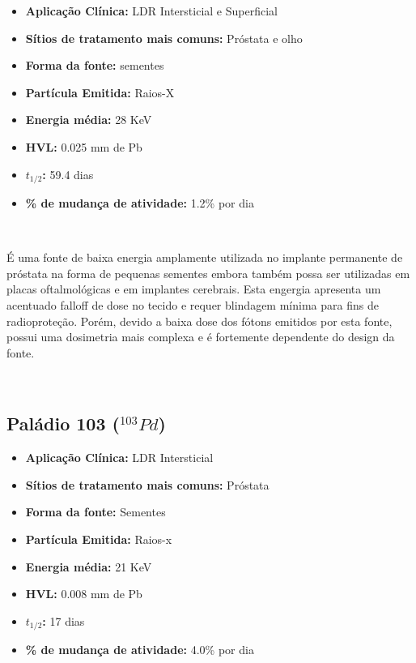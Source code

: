 \documentclass[11pt,a4paper]{article}
\begin{document}
			\begin{itemize}
				\item \textbf{Aplicação Clínica:} LDR Intersticial e Superficial
				\item \textbf{Sítios de tratamento mais comuns:} Próstata e olho
				\item \textbf{Forma da fonte:} sementes
				\item \textbf{Partícula Emitida:} Raios-X
				\item \textbf{Energia média: } 28 KeV
				\item \textbf{HVL:} 0.025 mm de Pb
				\item \textbf{$t_{1/2}$:} 59.4 dias
				\item \textbf{\% de mudança de atividade: } 1.2\% por dia
			\end{itemize}

			\

			É uma fonte de baixa energia amplamente utilizada no implante permanente de próstata na forma de pequenas sementes embora também possa ser utilizadas em placas oftalmológicas e em implantes cerebrais. Esta engergia apresenta um acentuado falloff de dose no tecido e requer blindagem mínima para fins de radioproteção. Porém, devido a baixa dose dos fótons emitidos por esta fonte, possui uma dosimetria mais complexa e é fortemente dependente do design da fonte.

			\

		\subsection{Paládio 103 \textbf{\textcolor{CarnationPink}{(${}^{103}Pd$)}}}


			\begin{itemize}
				\item \textbf{Aplicação Clínica:} LDR Intersticial
				\item \textbf{Sítios de tratamento mais comuns:} Próstata
				\item \textbf{Forma da fonte:} Sementes
				\item \textbf{Partícula Emitida:} Raios-x
				\item \textbf{Energia média: } 21 KeV
				\item \textbf{HVL:} 0.008 mm de Pb
				\item \textbf{$t_{1/2}$:} 17 dias
				\item \textbf{\% de mudança de atividade: } 4.0\% por dia
			\end{itemize}
\end{document}
